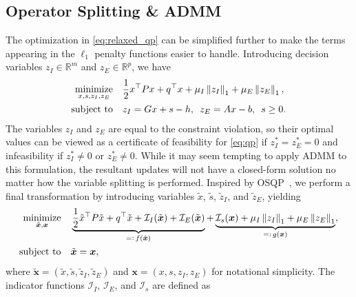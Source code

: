 \documentclass{article} %
\def\gI{{\mathcal{I}}}
\def\sR{{\mathbb{R}}}
\DeclareMathOperator*{\minimize}{minimize}
\DeclareMathOperator*{\st}{subject\ to}
\newcommand{\norm}[1]{\left\lVert#1\right\rVert}
\newcommand{\eqdef}{=\vcentcolon}
\newcommand{\hquad}{\hspace{0.5em}}
\begin{document}
\subsection{Operator Splitting \& ADMM}
The optimization in \cref{eq:relaxed_qp} can be simplified further to make the terms appearing in the $\ell_1$ penalty functions easier to handle. Introducing decision variables $z_I \in \sR^m$ and $z_E \in \sR^p$, we have
\begin{subequations} \label{eq:relaxed_qp_simplified}
\begin{align}
    \minimize_{x,s, z_I, z_E} \quad   & \frac{1}{2} x^\top P x + q^\top x + \mu_I \norm{z_I}_1 + \mu_E \norm{z_E}_1, \label{eq:relaxed_qp_simplified:obj} \\
    \st \quad & z_I = Gx + s - h, \hquad z_E = Ax - b, \hquad s \geq 0. \label{eq:relaxed_qp_simplified:constraints}
\end{align}
\end{subequations}
The variables $z_I$ and $z_E$ are equal to the constraint violation, so their optimal values can be viewed as a certificate of feasibility for \cref{eq:qp} if $z_I^* = z_E^* = 0$ and infeasibility if $z_I^* \neq 0$ or $z_E^* \neq 0$.
While it may seem tempting to apply ADMM to this formulation, the resultant updates will not have a closed-form solution no matter how the variable splitting is performed.
Inspired by OSQP~\citep{stellato2020osqp}, we perform a final transformation by introducing variables $\tilde{x}$, $\tilde{s}$, $\tilde{z}_I$, and $\tilde{z}_E$, yielding
\begin{subequations} \label{eq:FlexQP}
\begin{align}
    \minimize_{\tilde{\boldsymbol{x}}, \boldsymbol{x}} \quad   & \underbrace{\frac{1}{2} \tilde{x}^\top P \tilde{x} + q^\top \tilde{x} + \gI_I(\tilde{\boldsymbol{x}}) + \gI_E(\tilde{\boldsymbol{x}})}_{\eqdef \, f(\tilde{\boldsymbol{x}})} + \underbrace{\gI_s(\boldsymbol{x}) + \mu_I \norm{z_I}_1 + \mu_E \norm{z_E}_1}_{\eqdef \, g(\boldsymbol{x})}, \label{eq:FlexQP:obj} \\
    \st \quad & \tilde{\boldsymbol{x}}  = \boldsymbol{x},  \label{eq:FlexQP:constraints}
\end{align}
\end{subequations}
where $\tilde{\boldsymbol{x}} = (\tilde{x}, \tilde{s}, \tilde{z}_I, \tilde{z}_E)$ and $\boldsymbol{x} = (x, s, z_I, z_E)$ for notational simplicity. The indicator functions $\gI_I$, $\gI_E$, and $\gI_s$ are defined as
\end{document}
